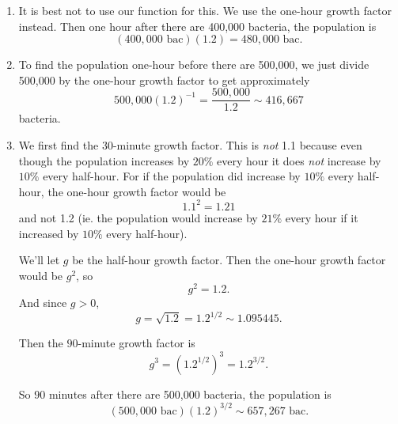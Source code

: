 \documentclass{ximera}
\begin{document}
\begin{example}
\begin{explanation}
\begin{enumerate}
Or that
\begin{align*}
 P &= f(t) \\
    &= f(3) (1.2)^{t-3} \\
    &= 360,000(1.2)^{t-3} \, , \, 1/4\leq t \leq 10.
\end{align*} 

Note: It is not necessary, nor is it proper, to find the population at noon. We cannot determine the population at this time from the given information. 

\item It is best not to use our function for this. We use the one-hour growth factor instead. Then one hour after there are 400,000 bacteria, the population is
\[
  (400,000 \text{ bac})(1.2) = 480,000 \text{ bac}.
\]

\item To find the population one-hour before there are 500,000, we just divide 500,000 by the one-hour growth factor to get approximately
\[
 500,000(1.2)^{-1} = \frac{500,000}{1.2} \sim 416,667
\]
bacteria.

\item We first find the $30$-minute growth factor. This is \emph{not} 1.1 because even though the population increases by $20\%$ every hour it does \emph{not} increase by $10\%$ every half-hour. For if the population did increase by $10\%$ every half-hour, the one-hour growth factor would be
\[
    1.1^2 = 1.21
\]
and not 1.2 (ie. the population would increase by $21\%$ every hour if it increased by $10\%$ every half-hour).

We'll let $g$ be the half-hour growth factor. Then the one-hour growth factor would be $g^2$, so
\[
    g^2 = 1.2 .
\]
And since $g>0$, 
\[
  g = \sqrt{1.2} = 1.2^{1/2} \sim 1.095445 .
\] 

Then the $90$-minute growth factor is
\[
 g^3 = \left( 1.2^{1/2} \right)^3 = 1.2^{3/2}.
\]

So $90$ minutes after there are 500,000 bacteria, the population is
\[
  (500,000 \text{ bac}) \left(  1.2 \right)^{3/2} \sim 657,267 \text{ bac}.
\]
\end{enumerate}
\end{explanation}

\end{example}
\end{document}
